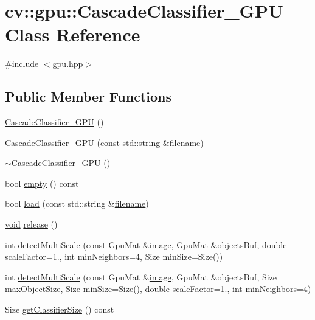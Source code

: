 \hypertarget{classcv_1_1gpu_1_1CascadeClassifier__GPU}{\section{cv\-:\-:gpu\-:\-:Cascade\-Classifier\-\_\-\-G\-P\-U Class Reference}
\label{classcv_1_1gpu_1_1CascadeClassifier__GPU}
}


{\ttfamily \#include $<$gpu.\-hpp$>$}

\subsection*{Public Member Functions}
\begin{DoxyCompactItemize}
\item 
\hyperlink{classcv_1_1gpu_1_1CascadeClassifier__GPU_aaf09238bba6978d99cdfb10162f9833a}{Cascade\-Classifier\-\_\-\-G\-P\-U} ()
\item 
\hyperlink{classcv_1_1gpu_1_1CascadeClassifier__GPU_a70ff69b18416b2b5902bfc17f0f821bf}{Cascade\-Classifier\-\_\-\-G\-P\-U} (const std\-::string \&\hyperlink{core__c_8h_acc427f35f3bd9f865d39012657cc42f8}{filename})
\item 
\hyperlink{classcv_1_1gpu_1_1CascadeClassifier__GPU_a493961c7677bb5631063c0d7c7f128b5}{$\sim$\-Cascade\-Classifier\-\_\-\-G\-P\-U} ()
\item 
bool \hyperlink{classcv_1_1gpu_1_1CascadeClassifier__GPU_a8fa3b2ba32c1929c7ebe4761b92d3fe9}{empty} () const 
\item 
bool \hyperlink{classcv_1_1gpu_1_1CascadeClassifier__GPU_a6943886ea4b55939e1f4428b6a072bc5}{load} (const std\-::string \&\hyperlink{core__c_8h_acc427f35f3bd9f865d39012657cc42f8}{filename})
\item 
\hyperlink{legacy_8hpp_a8bb47f092d473522721002c86c13b94e}{void} \hyperlink{classcv_1_1gpu_1_1CascadeClassifier__GPU_ae3bd3e9c997574c13ce3e11f25690cb4}{release} ()
\item 
int \hyperlink{classcv_1_1gpu_1_1CascadeClassifier__GPU_a93efcafb9ab71cc6fe01d3680110417b}{detect\-Multi\-Scale} (const Gpu\-Mat \&\hyperlink{legacy_8hpp_ad62b16ab219ae2483e8a3d921c44cc97}{image}, Gpu\-Mat \&objects\-Buf, double scale\-Factor=1., int min\-Neighbors=4, Size min\-Size=Size())
\item 
int \hyperlink{classcv_1_1gpu_1_1CascadeClassifier__GPU_a1c2d44612ced4cd8cf6d8ba28a6c9e95}{detect\-Multi\-Scale} (const Gpu\-Mat \&\hyperlink{legacy_8hpp_ad62b16ab219ae2483e8a3d921c44cc97}{image}, Gpu\-Mat \&objects\-Buf, Size max\-Object\-Size, Size min\-Size=Size(), double scale\-Factor=1., int min\-Neighbors=4)
\item 
Size \hyperlink{classcv_1_1gpu_1_1CascadeClassifier__GPU_a7c30977e8ebea8bd391c4a1478f02ab7}{get\-Classifier\-Size} () const 
\end{DoxyCompactItemize}
